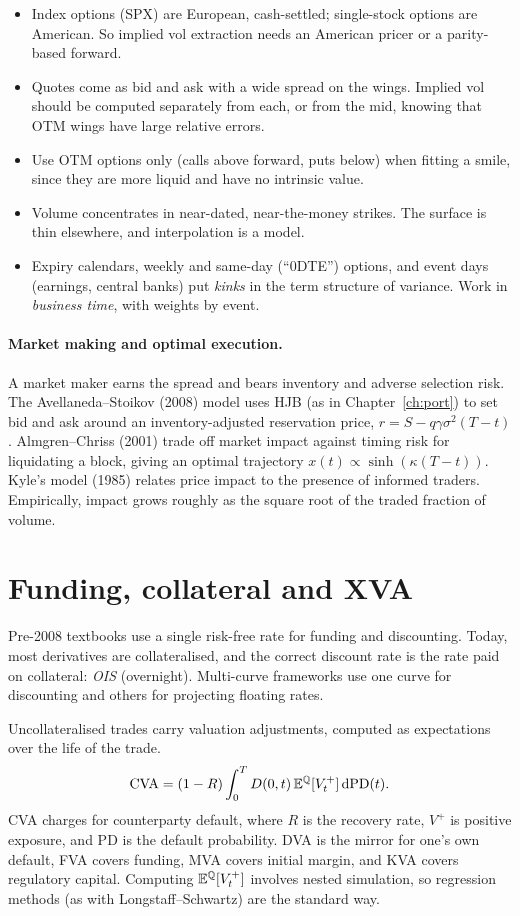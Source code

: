 \begin{itemize}
\item Index options (SPX) are European, cash-settled; single-stock options are American. So implied vol extraction needs an American pricer or a parity-based forward.
\item Quotes come as bid and ask with a wide spread on the wings. Implied vol should be computed separately from each, or from the mid, knowing that OTM wings have large relative errors.
\item Use OTM options only (calls above forward, puts below) when fitting a smile, since they are more liquid and have no intrinsic value.
\item Volume concentrates in near-dated, near-the-money strikes. The surface is thin elsewhere, and interpolation is a model.
\item Expiry calendars, weekly and same-day (``0DTE'') options, and event days (earnings, central banks) put \emph{kinks} in the term structure of variance. Work in \emph{business time}, with weights by event.
\end{itemize}

\paragraph{Market making and optimal execution.} A market maker earns the spread and bears inventory and adverse selection risk. The Avellaneda--Stoikov (2008) model uses HJB (as in Chapter~\ref{ch:port}) to set bid and ask around an inventory-adjusted reservation price, $r=S-q\gamma\sigma^2(T-t)$. Almgren--Chriss (2001) trade off market impact against timing risk for liquidating a block, giving an optimal trajectory $x(t)\propto\sinh(\kappa(T-t))$. Kyle's model (1985) relates price impact to the presence of informed traders. Empirically, impact grows roughly as the square root of the traded fraction of volume.

\section{Funding, collateral and XVA}

Pre-2008 textbooks use a single risk-free rate for funding and discounting. Today, most derivatives are collateralised, and the correct discount rate is the rate paid on collateral: \emph{OIS} (overnight). Multi-curve frameworks use one curve for discounting and others for projecting floating rates.

Uncollateralised trades carry valuation adjustments, computed as expectations over the life of the trade.
\[
\mathrm{CVA}=(1-R)\int_0^TD(0,t)\,\mathbb{E}^{\mathbb{Q}}[V_t^+]\,\mathrm{d}\mathrm{PD}(t).
\]
CVA charges for counterparty default, where $R$ is the recovery rate, $V^+$ is positive exposure, and $\mathrm{PD}$ is the default probability. DVA is the mirror for one's own default, FVA covers funding, MVA covers initial margin, and KVA covers regulatory capital. Computing $\mathbb{E}^{\mathbb{Q}}[V_t^+]$ involves nested simulation, so regression methods (as with Longstaff--Schwartz) are the standard way.

